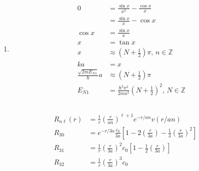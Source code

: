 \documentclass{article}
\begin{document}
\begin{enumerate}
  \item

        \begin{align*}
          0                                  & = \frac{\sin x}{x^2} - \frac{\cos x}{x}                                              \\
                                             & = \frac{\sin x}{x} - \cos x                                                          \\
          \cos x                             & = \frac{\sin x}{x}                                                                   \\
          x                                  & = \tan x                                                                             \\
          x                                  & \approx \left( N + \frac{1}{2} \right) \pi, \,n \in \mathbb{Z}                       \\
          k a                                & = x                                                                                  \\
          \frac{\sqrt{2 m E_{N 1}}}{\hbar} a & \approx \left( N + \frac{1}{2} \right) \pi                                           \\
          E_{N 1}                            & = \frac{\hbar^2 \pi^2}{2 m a^2} \left( N + \frac{1}{2} \right)^2, \,N \in \mathbb{Z}
        \end{align*}
\end{enumerate}

\setcounter{subsection}{11}
\subsection{}

\begin{align*}
  R_{n \ell}(r) & = \frac{1}{r} \left( \frac{r}{a n} \right)^{\ell + 1} e^{-r / a n} v(r / a n)                                                 \\
  R_{3 0}       & = e^{-r / 3 a} \frac{c_0}{3 a} \left[ 1 - 2 \left( \frac{r}{3 a} \right) - \frac{1}{3} \left( \frac{r}{3 a} \right)^2 \right] \\
  R_{3 1}       & = \frac{1}{r} \left( \frac{r}{3 a} \right)^2 c_0 \left[ 1 - \frac{1}{2} \left( \frac{r}{3 a} \right) \right]                  \\
  R_{3 2}       & = \frac{1}{r} \left( \frac{r}{3 a} \right)^3 c_0
\end{align*}
\end{document}
